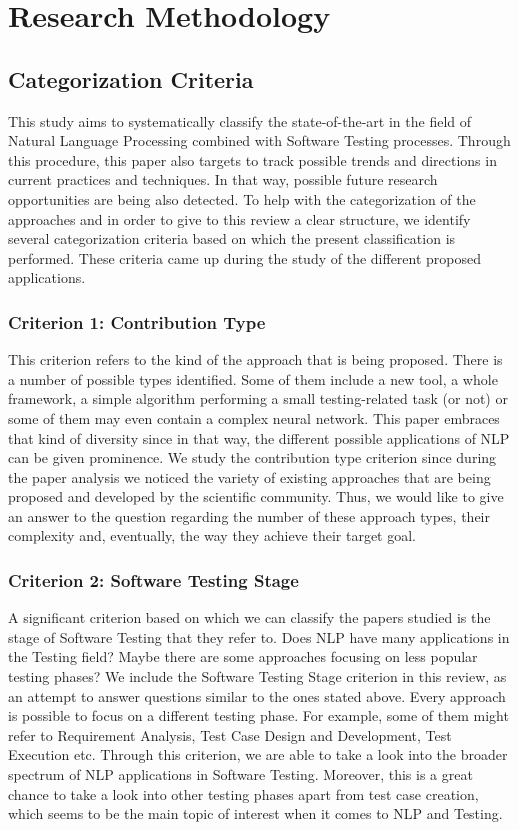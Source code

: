 \section {Research Methodology}

\subsection {Categorization Criteria}
This study aims to systematically classify the state-of-the-art in the field of Natural Language Processing combined with Software Testing 
processes. Through this procedure, this paper also targets to track possible trends and directions in current practices and techniques. In that 
way, possible future research opportunities are being also detected. To help with the categorization of the approaches and in order to give to this review a 
clear structure, we identify several categorization criteria based on which the present classification is performed. These criteria came up during the study of 
the different proposed applications. 

\subsubsection* {Criterion 1: Contribution Type}
This criterion refers to the kind of the approach that is being proposed. There is a number of possible types identified. Some of them include a new tool, 
a whole framework, a simple algorithm performing a small testing-related task (or not) or some of them may even contain a complex neural network. This paper embraces that kind of 
diversity since in that way, the different possible applications of NLP can be given prominence. We study the contribution type criterion since during the paper analysis we 
noticed the variety of existing approaches that are being proposed and developed by the scientific community. Thus, we would like to give an answer to the question regarding 
the number of these approach types, their complexity and, eventually, the way they achieve their target goal.

\subsubsection* {Criterion 2: Software Testing Stage}
A significant criterion based on which we can classify the papers studied is the stage of Software Testing that they refer to. Does NLP have many applications in the Testing field? 
Maybe there are some approaches focusing on less popular testing phases? We include the Software Testing Stage criterion in this review, as an attempt to answer questions similar 
to the ones stated above. Every approach is possible to focus on a different testing phase. For example, some of them might refer to Requirement Analysis, Test Case Design and Development, Test 
Execution etc. Through this criterion, we are able to take a look into the broader spectrum of NLP applications in Software Testing. Moreover, this is a great chance to take a 
look into other testing phases apart from test case creation, which seems to be the main topic of interest when it comes to NLP and Testing.

